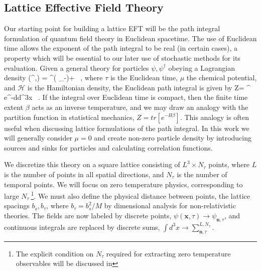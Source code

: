 \subsection{\label{sec:LEFT}Lattice Effective Field Theory}

Our starting point for building a lattice EFT will be the path integral formulation of quantum field theory in Euclidean spacetime. The use of Euclidean time allows the exponent of the path integral to be real (in certain cases), a property which will be essential to our later use of stochastic methods for its evaluation. Given a general theory for particles $\psi,\psi^{\dagger}$ obeying a Lagrangian density \beq 
{}(\psi^{\dagger},\psi) = \psi^{\dagger}\left( \partial_{\tau}-\mu \right)\psi+ \left[\psi^{\dagger}, \psi\right] \ ,
\eeq
where $\tau$ is the Euclidean time, $\mu$ the chemical potential, and $\mathcal{H}$ is the Hamiltonian density, the Euclidean path integral is given by
\beq
Z=\int {} \psi^{\dagger} \psi e^{-\int d\tau d^3x} \ .
\eeq
If the integral over Euclidean time is compact, then the finite time extent $\beta$ acts as an inverse temperature, and we may draw an analogy with the partition function in statistical mechanics, $Z = tr\left[e^{-H\beta}\right]$. This analogy is often useful when discussing lattice formulations of the path integral. In this work we will generally consider $\mu=0$ and create non-zero particle density by introducing sources and sinks for particles and calculating correlation functions. 

We discretize this theory on a square lattice consisting of $L^3 \times N_{\tau}$ points, where $L$ is the number of points in all spatial directions, and $N_{\tau}$ is the number of temporal points. We will focus on zero temperature physics, corresponding to large $N_{\tau} ~$\footnote{The explicit condition on $N_{\tau}$ required for extracting zero temperature observables will be discussed in }. We must also define the physical distance between points, the lattice spacings $b_s, b_{\tau}$, where $b_{\tau} = b_s^2/M$ by dimensional analysis for non-relativistic theories. The fields are now labeled by discrete points, $\psi(\mathbf{x},\tau) \to \psi_{\mathbf{n},\tau}$, and continuous integrals are replaced by discrete sums, $\int d^3x \to \sum_{\mathbf{n},\tau}^{L,N_{\tau}}$.

